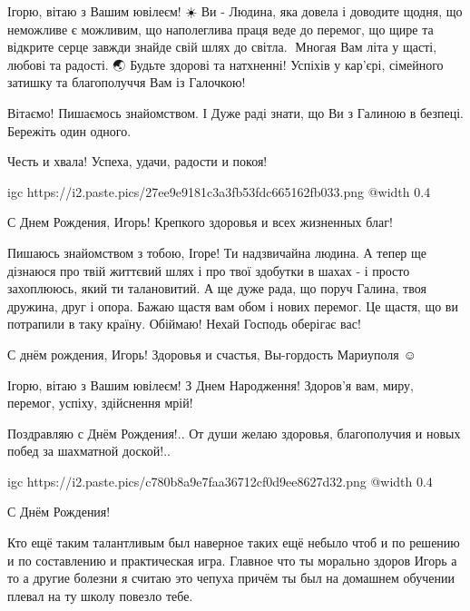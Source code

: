 
Ігорю, вітаю з Вашим ювілеєм! ☀️ Ви - Людина, яка довела і доводите щодня, що
неможливе є можливим, що наполеглива праця веде до перемог, що щире та відкрите
серце завжди знайде свій шлях до світла. 🌟Многая Вам літа у щасті, любові та
радості. 🌏 Будьте здорові та натхненні! Успіхів у кар'єрі, сімейного затишку
та благополуччя Вам із Галочкою! 💙💛


Вітаємо! Пишаємось знайомством. І Дуже раді знати, що Ви з Галиною в безпеці. Бережіть один одного.


Честь и хвала! Успеха, удачи, радости и покоя!

\ifcmt
  igc https://i2.paste.pics/27ee9e9181c3a3fb53fdc665162fb033.png
	@width 0.4
\fi


С Днем Рождения, Игорь! Крепкого здоровья и всех жизненных благ!


Пишаюсь знайомством з тобою, Ігоре! Ти надзвичайна людина. А тепер ще дізнаюся
про твій життєвий шлях і про твої здобутки в шахах - і просто захоплююсь, який
ти талановитий. А ще дуже рада, що поруч Галина, твоя дружина, друг і опора.
Бажаю щастя вам обом і нових перемог. Це щастя, що ви потрапили в таку країну.
Обіймаю! Нехай Господь оберігає вас!


С днём рождения, Игорь! Здоровья и счастья, Вы-гордость Мариуполя ☺


Ігорю, вітаю з Вашим ювілеєм! З Днем Народження! Здоров'я вам, миру, перемог,
успіху, здійснення мрій!


Поздравляю с Днём Рождения!.. От души желаю здоровья, благополучия и новых побед за шахматной доской!..


\ifcmt
  igc https://i2.paste.pics/c780b8a9e7faa36712cf0d9ee8627d32.png
	@width 0.4
\fi


С Днём Рождения!


Кто ещё таким талантливым был наверное таких ещё небыло чтоб и по решению и по
составлению и практическая игра. Главное что ты морально здоров Игорь а то а
другие болезни я считаю это чепуха причём ты был на домашнем обучении плевал на
ту школу повезло тебе.
